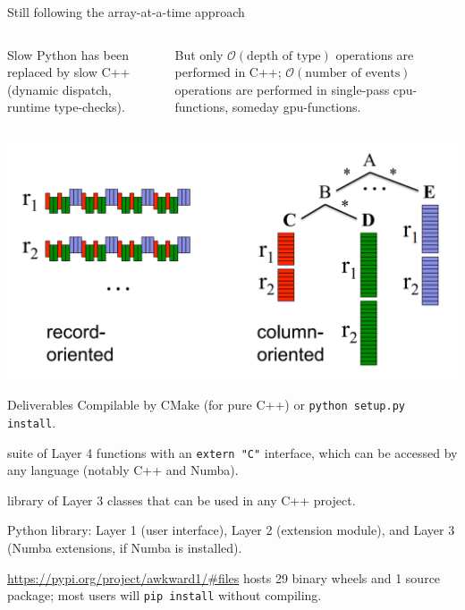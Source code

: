 \documentclass[aspectratio=169]{beamer}
\begin{document}
\begin{frame}{Still following the array-at-a-time approach}
\large
\vspace{1 cm}
\begin{columns}
Slow Python has been replaced by slow C++ (dynamic dispatch, runtime type-checks).

\vspace{0.75 cm}
But only $\mathcal{O}(\mbox{depth of type})$ operations are performed in C++; $\mathcal{O}(\mbox{number of events})$ operations are performed in single-pass cpu-functions, someday gpu-functions.
\end{columns}

\begin{center}
\includegraphics[width=0.5\linewidth]{google-dremel-fig1.png}
\end{center}
\end{frame}

\begin{frame}{Deliverables}
\large
\vspace{0.75 cm}
Compilable by CMake (for pure C++) or \texttt{python setup.py install}.

\vspace{0.5 cm}
\begin{description}\setlength{\itemsep}{0.5 cm}
\item[cpu-kernels.so] suite of Layer 4 functions with an \texttt{extern "C"} interface, which can be accessed by any language (notably C++ and Numba).

\item[libawkward.so] library of Layer 3 classes that can be used in any C++ project.

\item[\hspace{0.75 cm}awkward1] Python library: Layer 1 (user interface), Layer 2 (extension module), and Layer 3 (Numba extensions, if Numba is installed).
\end{description}

\vspace{0.75 cm}
\textcolor{blue}{\normalsize \url{https://pypi.org/project/awkward1/\#files}} hosts 29 binary wheels and 1 source package; most users will \texttt{pip install} without compiling.
\end{frame}
\end{document}
